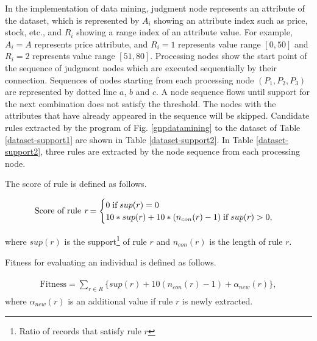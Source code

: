 \documentclass{elsart}
\begin{document}
In the implementation of data mining, judgment node represents an attribute of the dataset, which is represented by $A_{i}$ showing an attribute index such as price, stock, etc., and $R_{i}$ showing a range index of an attribute value. For example, $A_{i}=A$ represents price attribute, and $R_{i}=1$ represents value range $[0,50]$ and $R_{i}=2$ represents value range $[51,80]$. Processing nodes show the start point of the sequence of judgment nodes which are executed sequentially by their connection. Sequences of nodes starting from each processing node $(P_{1},P_{2},P_{3})$ are represented by dotted line $a$, $b$ and $c$. A node sequence flows until support for the next combination does not satisfy the threshold. The nodes with the attributes that have already appeared in the sequence will be skipped. Candidate rules extracted by the program of Fig. \ref{gnpdatamining} to the dataset of Table \ref{dataset-support1} are shown in Table \ref{dataset-support2}. In Table \ref{dataset-support2}, three rules are extracted by the node sequence from each processing node. %

The score of rule is defined as follows.

\begin{eqnarray}
\begin{array}{lll}
\text{Score of rule \it{r}}=\begin{cases} 0 \;\text{if}\; sup(r)=0 & \\ 10*sup(r)+10*(n_{con}(r)-1) \;\text{if}\; sup(r)>0, \end{cases}
\end{array}
\label{eq:fitness}
\end{eqnarray}

where $sup(r)$ is the support\footnote{Ratio of records that satisfy rule $r$} of rule $r$ and $n_{con}(r)$ is the length of rule $r$.

Fitness for evaluating an individual is defined as follows.

\begin{eqnarray}
\begin{array}{lll}
\text{Fitness}=\underset{r\in R}{\sum}\{sup(r)+10(n_{con}(r)-1)+\alpha_{new}(r)\},
\end{array}
\label{eq:fitness1}
\end{eqnarray}
where $\alpha_{new}(r)$ is an additional value if rule $r$ is newly extracted.
\end{document}
